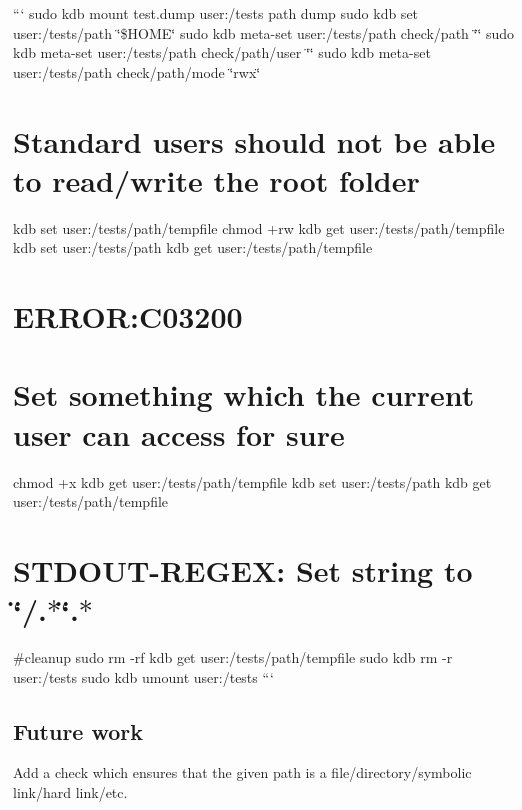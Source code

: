 ``` sudo kdb mount test.\+dump user\+:/tests path dump sudo kdb set user\+:/tests/path \char`\"{}\$\+H\+O\+M\+E\char`\"{} sudo kdb meta-\/set user\+:/tests/path check/path \char`\"{}\char`\"{} sudo kdb meta-\/set user\+:/tests/path check/path/user \char`\"{}\char`\"{} sudo kdb meta-\/set user\+:/tests/path check/path/mode \char`\"{}rwx\char`\"{}\hypertarget{autotoc_md486_autotoc_md490}{}\section{Standard users should not be able to read/write the root folder}\label{autotoc_md486_autotoc_md490}
kdb set user\+:/tests/path/tempfile  chmod +rw {\ttfamily kdb get user\+:/tests/path/tempfile} kdb set user\+:/tests/path {\ttfamily kdb get user\+:/tests/path/tempfile} \hypertarget{autotoc_md486_autotoc_md491}{}\section{E\+R\+R\+O\+R\+:\+C03200}\label{autotoc_md486_autotoc_md491}
\hypertarget{autotoc_md486_autotoc_md492}{}\section{Set something which the current user can access for sure}\label{autotoc_md486_autotoc_md492}
chmod +x {\ttfamily kdb get user\+:/tests/path/tempfile} kdb set user\+:/tests/path {\ttfamily kdb get user\+:/tests/path/tempfile} \hypertarget{autotoc_md486_autotoc_md493}{}\section{S\+T\+D\+O\+U\+T-\/\+R\+E\+G\+E\+X\+: Set string to \char`\"{}/.$\ast$\char`\"{}.$\ast$}\label{autotoc_md486_autotoc_md493}
\#cleanup sudo rm -\/rf {\ttfamily kdb get user\+:/tests/path/tempfile} sudo kdb rm -\/r user\+:/tests sudo kdb umount user\+:/tests ```\hypertarget{autotoc_md486_autotoc_md494}{}\subsection{Future work}\label{autotoc_md486_autotoc_md494}
Add a check which ensures that the given path is a file/directory/symbolic link/hard link/etc. 
